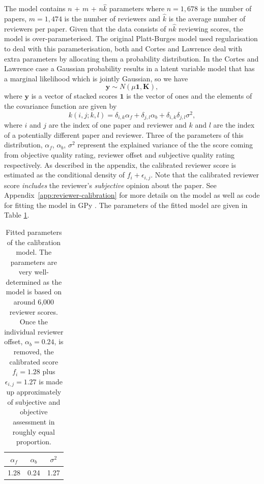 \documentclass[twoside]{article}
\begin{document}
The model contains $n$ + $m$ + $n\hat{k}$ parameters where $n=1,678$
is the number of papers, $m=1,474$ is the number of reviewers and
$\hat{k}$ is the average number of reviewers per paper. Given that the
data consists of $n\hat{k}$ reviewing scores, the model is
over-parameterised. The original Platt-Burges model used
regularisation to deal with this parameterisation, both
\cite{Ge-bayesian15} and Cortes and Lawrence deal with extra
parameters by allocating them a probability distribution. In the
Cortes and Lawrence case a Gaussian probability results in a latent
variable model that has a marginal likelihood which is jointly
Gaussian, so we have
$$
\mathbf{y} \sim N(\mu \mathbf{1}, \mathbf{K}),
$$
where $\mathbf{y}$ is a vector of stacked scores $\mathbf{1}$ is
the vector of ones and the elements of the covariance function are given
by
$$
k(i,j; k,l) = \delta_{i,k} \alpha_f + \delta_{j,l} \alpha_b + \delta_{i, k}\delta_{j,l} \sigma^2,
$$ where $i$ and $j$ are the index of one paper and reviewer and $k$
and $l$ are the index of a potentially different paper and
reviewer. Three of the parameters of this distribution, $\alpha_f$,
$\alpha_b$, $\sigma^2$ represent the explained variance of the the
score coming from objective quality rating, reviewer offset and
subjective quality rating respectively. As described in the appendix,
the calibrated reviewer score is estimated as the conditional density
of $f_i + \epsilon_{i,j}$. Note that the calibrated reviewer score
\emph{includes} the reviewer's \emph{subjective} opinion about the
paper. See Appendix~\ref{app:reviewer-calibration} for more details
on the model as well as code for fitting the model in GPy
\cite{Gpy-2012}. The parameters of the fitted model are given in
Table \ref{table-fitted-calibration-parameters}.

\begin{table}[htb]
  \label{table-fitted-calibration-parameters}
  \caption{Fitted parameters of the calibration model. The parameters
    are very well-determined as the model is based on around 6,000
    reviewer scores. Once the individual reviewer offset,
    $\alpha_b=0.24$, is removed, the calibrated score $f_i = 1.28$
    plus $\epsilon_{i,j}=1.27$ is made up approximately of subjective
    and objective assessment in roughly equal proportion.}
  \begin{center}
  \begin{tabular}{ccc}
    $\alpha_f$ & $\alpha _b$ & $\sigma^2$ \\ \hline
    1.28 & 0.24 & 1.27
  \end{tabular}
  \end{center}
\end{table}  
\end{document}

